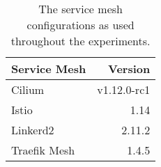 \begin{table*}[t]
\centering

\begin{tabular}{l r}

    \toprule
    Service Mesh       & Version \\
    \toprule
    
    Cilium             & v1.12.0-rc1  \\
    Istio              & 1.14 \\
    Linkerd2           & 2.11.2  \\
    Traefik Mesh       & 1.4.5   \\
    \bottomrule
    
\end{tabular}

\caption{The service mesh configurations as used throughout the experiments.}
\label{tab:experiment:design:mesh}
\end{table*}

